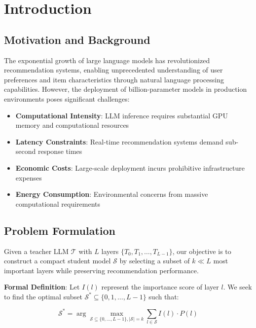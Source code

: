\documentclass[sigconf]{acmart}
\begin{document}
\maketitle

\section{Introduction}

\subsection{Motivation and Background}

The exponential growth of large language models has revolutionized recommendation systems, enabling unprecedented understanding of user preferences and item characteristics through natural language processing capabilities. However, the deployment of billion-parameter models in production environments poses significant challenges:

\begin{itemize}
\item \textbf{Computational Intensity}: LLM inference requires substantial GPU memory and computational resources
\item \textbf{Latency Constraints}: Real-time recommendation systems demand sub-second response times  
\item \textbf{Economic Costs}: Large-scale deployment incurs prohibitive infrastructure expenses
\item \textbf{Energy Consumption}: Environmental concerns from massive computational requirements
\end{itemize}

\subsection{Problem Formulation}

Given a teacher LLM $\mathcal{T}$ with $L$ layers $\{T_0, T_1, \ldots, T_{L-1}\}$, our objective is to construct a compact student model $\mathcal{S}$ by selecting a subset of $k \ll L$ most important layers while preserving recommendation performance.

\textbf{Formal Definition}: Let $I(l)$ represent the importance score of layer $l$. We seek to find the optimal subset $\mathcal{S}^* \subseteq \{0, 1, \ldots, L-1\}$ such that:

\begin{equation}
\mathcal{S}^* = \arg\max_{\mathcal{S} \subseteq \{0,\ldots,L-1\}, |\mathcal{S}|=k} \sum_{l \in \mathcal{S}} I(l) \cdot P(l)
\end{equation}
\end{document}

